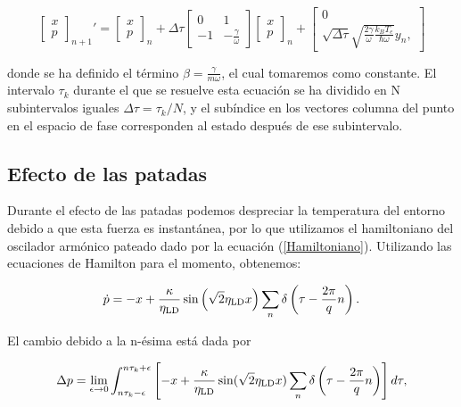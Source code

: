 \documentclass[letterpaper,12pt,oneside]{book}
\begin{document}
	\begin{equation}
		\begin{bmatrix}
		x \\ p
		\end{bmatrix}_{n+1}' = 
		\begin{bmatrix}
		x \\ p
		\end{bmatrix}_{n}
		+ \Delta\tau
		\begin{bmatrix}
		0 & 1 \\
		-1 & - \frac{\gamma}{\omega}
		\end{bmatrix}
		\begin{bmatrix}
		x \\ p
		\end{bmatrix}_n
		+
		\begin{bmatrix}
		0 \\ \sqrt{\Delta \tau}\sqrt{\frac{2\gamma}{\omega}\frac{k_BT_e}{\hbar\omega}}y_n,
		\end{bmatrix}
	\end{equation}
	
	\noindent donde se ha definido el t\'ermino $\beta = \frac{\gamma}{m\omega}$, el cual tomaremos como constante. El intervalo $\tau_k$ durante el que se resuelve esta ecuaci\'on se ha dividido en N subintervalos iguales $\Delta\tau = \tau_k / N$, y el sub\'indice en los vectores columna del punto en el espacio de fase corresponden al estado despu\'es de ese subintervalo.
	
	\subsection{Efecto de las patadas}
	
	Durante el efecto de las patadas podemos despreciar la temperatura del entorno debido a que esta fuerza es instant\'anea, por lo que utilizamos el hamiltoniano del oscilador arm\'onico pateado dado por la ecuaci\'on (\ref{Hamiltoniano}). Utilizando las ecuaciones de Hamilton para el momento, obtenemos:
	
	\begin{equation}
		\dot{p} = -x + \frac{\kappa}{\eta_{\rm LD}}\sin \left( \sqrt{2} \eta_{\rm LD} x\right) \sum_n\delta\left(\tau-\frac{2\pi}{q}n\right).
	\end{equation}
	
	El cambio debido a la n-\'esima est\'a dada por
	
	\begin{equation}
		\Delta p = \lim_{\epsilon \rightarrow 0} \int_{n\tau_k-\epsilon}^{n\tau_k+\epsilon} \left[-x + \frac{\kappa}{\eta_{\rm LD}}\sin (\sqrt{2} \eta_{\rm LD} x) \sum_n\delta\left(\tau-\frac{2\pi}{q}n\right) \right]d\tau,
	\end{equation}
	
\end{document}
